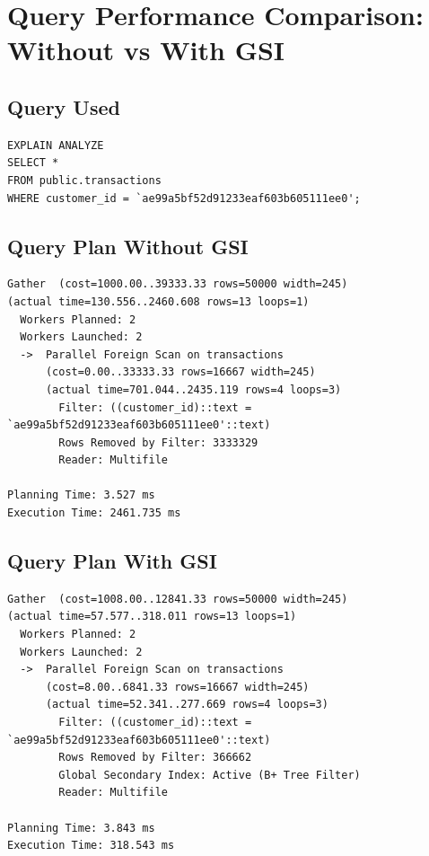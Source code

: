 \documentclass[11pt, a4paper]{article}
\begin{document}
\section{Query Performance Comparison: Without vs With GSI}

\subsection{Query Used}
\begin{verbatim}
EXPLAIN ANALYZE 
SELECT * 
FROM public.transactions
WHERE customer_id = `ae99a5bf52d91233eaf603b605111ee0';
\end{verbatim}

\subsection{Query Plan Without GSI}
\begin{verbatim}
Gather  (cost=1000.00..39333.33 rows=50000 width=245) 
(actual time=130.556..2460.608 rows=13 loops=1)
  Workers Planned: 2
  Workers Launched: 2
  ->  Parallel Foreign Scan on transactions  
      (cost=0.00..33333.33 rows=16667 width=245) 
      (actual time=701.044..2435.119 rows=4 loops=3)
        Filter: ((customer_id)::text = `ae99a5bf52d91233eaf603b605111ee0'::text)
        Rows Removed by Filter: 3333329
        Reader: Multifile

Planning Time: 3.527 ms
Execution Time: 2461.735 ms
\end{verbatim}

\subsection{Query Plan With GSI}
\begin{verbatim}
Gather  (cost=1008.00..12841.33 rows=50000 width=245) 
(actual time=57.577..318.011 rows=13 loops=1)
  Workers Planned: 2
  Workers Launched: 2
  ->  Parallel Foreign Scan on transactions  
      (cost=8.00..6841.33 rows=16667 width=245) 
      (actual time=52.341..277.669 rows=4 loops=3)
        Filter: ((customer_id)::text = `ae99a5bf52d91233eaf603b605111ee0'::text)
        Rows Removed by Filter: 366662
        Global Secondary Index: Active (B+ Tree Filter)
        Reader: Multifile

Planning Time: 3.843 ms
Execution Time: 318.543 ms
\end{verbatim}
\end{document}

